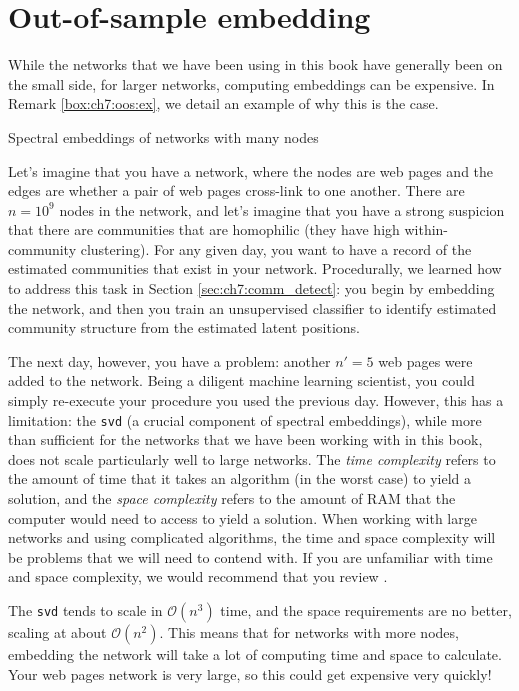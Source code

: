 \section{Out-of-sample embedding}
\label{sec:ch7:oos}

While the networks that we have been using in this book have generally been on the small side, for larger networks, computing embeddings can be expensive. In Remark \ref{box:ch7:oos:ex}, we detail an example of why this is the case.

\begin{floatingbox}[h]\caption{Spectral embeddings of networks with many nodes}
\label{box:ch7:oos:ex}
Let's imagine that you have a network, where the nodes are web pages and the edges are whether a pair of web pages cross-link to one another. There are $n=10^9$ nodes in the network, and let's imagine that you have a strong suspicion that there are communities that are homophilic (they have high within-community clustering). For any given day, you want to have a record of the estimated communities that exist in your network. Procedurally, we learned how to address this task in Section \ref{sec:ch7:comm_detect}: you begin by embedding the network, and then you train an unsupervised classifier to identify estimated community structure from the estimated latent positions.

The next day, however, you have a problem: another $n'=5$ web pages were added to the network. Being a diligent machine learning scientist, you could simply re-execute your procedure you used the previous day. However, this has a limitation: the \texttt{svd} (a crucial component of spectral embeddings), while more than sufficient for the networks that we have been working with in this book, does not scale particularly well to large networks. The \textit{time complexity} refers to the amount of time that it takes an algorithm (in the worst case) to yield a solution, and the \textit{space complexity} refers to the amount of RAM that the computer would need to access to yield a solution. When working with large networks and using complicated algorithms, the time and space complexity will be problems that we will need to contend with. If you are unfamiliar with time and space complexity, we would recommend that you review \cite{Banerjee2021Dec}.

The \texttt{svd} tends to scale in $\mathcal O(n^3)$ time, and the space requirements are no better, scaling at about $\mathcal O(n^2)$. This means that for networks with more nodes, embedding the network will take a lot of computing time and space to calculate. Your web pages network is very large, so this could get expensive very quickly!
\end{floatingbox}

